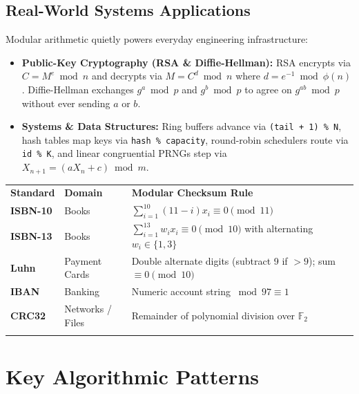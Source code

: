 \documentclass[11pt,a4paper]{article}
\theoremstyle{definition}
\begin{document}
\subsection{Real-World Systems Applications}

Modular arithmetic quietly powers everyday engineering infrastructure:
\begin{itemize}
    \item \textbf{Public-Key Cryptography (RSA \& Diffie-Hellman):} RSA encrypts via $C = M^e \bmod n$ and decrypts via $M = C^d \bmod n$ where $d = e^{-1} \bmod \phi(n)$. Diffie-Hellman exchanges $g^a \bmod p$ and $g^b \bmod p$ to agree on $g^{ab} \bmod p$ without ever sending $a$ or $b$.
    \item \textbf{Systems \& Data Structures:} Ring buffers advance via \texttt{(tail + 1) \% N}, hash tables map keys via \texttt{hash \% capacity}, round-robin schedulers route via \texttt{id \% K}, and linear congruential PRNGs step via $X_{n+1} = (a X_n + c) \bmod m$.
\end{itemize}

\begingroup\small{}
\begin{tabularx}{\textwidth}{>{\raggedright\arraybackslash\bfseries}p{2.3cm} >{\raggedright\arraybackslash}p{3.0cm} >{\raggedright\arraybackslash}X}
\arrayrulecolor{primaryblue}\toprule[1.2pt]
\rowcolor{primaryblue!10}
\textcolor{primaryblue}{\textbf{Standard}} & \textcolor{primaryblue}{\textbf{Domain}} & \textcolor{primaryblue}{\textbf{Modular Checksum Rule}} \\
\arrayrulecolor{codeframe}\midrule[0.6pt]
ISBN-10 & Books & $\sum_{i=1}^{10} (11 - i) x_i \equiv 0 \pmod{11}$ \\
ISBN-13 & Books & $\sum_{i=1}^{13} w_i x_i \equiv 0 \pmod{10}$ with alternating $w_i \in \{1, 3\}$ \\
Luhn & Payment Cards & Double alternate digits (subtract 9 if $> 9$); sum $\equiv 0 \pmod{10}$ \\
IBAN & Banking & Numeric account string $\bmod 97 \equiv 1$ \\
CRC32 & Networks / Files & Remainder of polynomial division over $\mathbb{F}_2$ \\
\arrayrulecolor{primaryblue}\bottomrule[1.2pt]
\end{tabularx}\endgroup

\section{Key Algorithmic Patterns}
\end{document}
